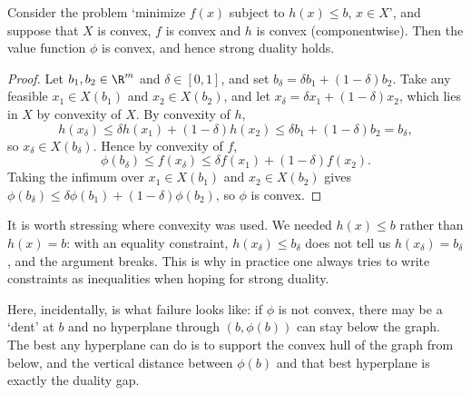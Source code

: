 \begin{theorem}
    Consider the problem `minimize $f(x)$ subject to $h(x) \leq b$, $x \in X$', and suppose that $X$ is convex, $f$ is convex and $h$ is convex (componentwise). Then the value function $\phi$ is convex, and hence strong duality holds.
\end{theorem}
\begin{proof}
    Let $b_1, b_2 \in \R^m$ and $\delta \in [0,1]$, and set $b_\delta = \delta b_1 + (1-\delta)b_2$. Take any feasible $x_1 \in X(b_1)$ and $x_2 \in X(b_2)$, and let $x_\delta = \delta x_1 + (1 - \delta)x_2$, which lies in $X$ by convexity of $X$. By convexity of $h$,
    $$
    h(x_\delta) \leq \delta h(x_1) + (1 - \delta)h(x_2) \leq \delta b_1 + (1-\delta)b_2 = b_\delta,
    $$
    so $x_\delta \in X(b_\delta)$. Hence by convexity of $f$,
    $$
    \phi(b_\delta) \leq f(x_\delta) \leq \delta f(x_1) + (1-\delta)f(x_2).
    $$
    Taking the infimum over $x_1 \in X(b_1)$ and $x_2 \in X(b_2)$ gives $\phi(b_\delta) \leq \delta\phi(b_1) + (1-\delta)\phi(b_2)$, so $\phi$ is convex.
\end{proof}

\begin{remark}
    It is worth stressing where convexity was used. We needed $h(x) \leq b$ rather than $h(x) = b$: with an equality constraint, $h(x_\delta) \leq b_\delta$ does not tell us $h(x_\delta) = b_\delta$, and the argument breaks. This is why in practice one always tries to write constraints as inequalities when hoping for strong duality.
\end{remark}

Here, incidentally, is what failure looks like: if $\phi$ is not convex, there may be a `dent' at $b$ and no hyperplane through $(b, \phi(b))$ can stay below the graph. The best any hyperplane can do is to support the convex hull of the graph from below, and the vertical distance between $\phi(b)$ and that best hyperplane is exactly the duality gap.

\begin{center}
\end{center}

